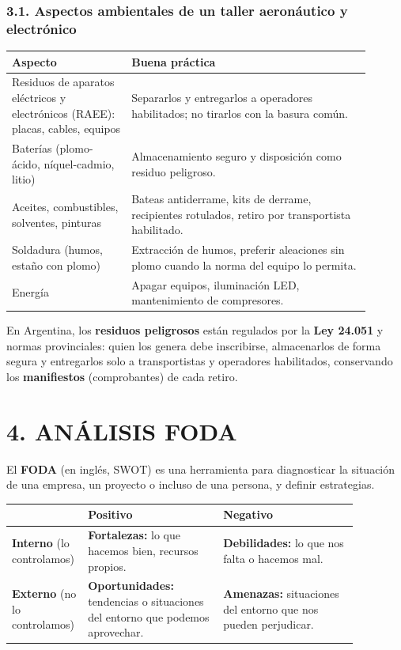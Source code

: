 \subsubsection*{3.1. Aspectos ambientales de un taller aeronáutico y electrónico}
\begin{center}
\small
\begin{tabular}{|p{0.30\linewidth}|p{0.60\linewidth}|}
\hline
\textbf{Aspecto} & \textbf{Buena práctica} \\ \hline
Residuos de aparatos eléctricos y electrónicos (RAEE): placas, cables, equipos & Separarlos y
entregarlos a operadores habilitados; no tirarlos con la basura común. \\ \hline
Baterías (plomo-ácido, níquel-cadmio, litio) & Almacenamiento seguro y disposición como
residuo peligroso. \\ \hline
Aceites, combustibles, solventes, pinturas & Bateas antiderrame, kits de derrame,
recipientes rotulados, retiro por transportista habilitado. \\ \hline
Soldadura (humos, estaño con plomo) & Extracción de humos, preferir aleaciones sin plomo cuando
la norma del equipo lo permita. \\ \hline
Energía & Apagar equipos, iluminación LED, mantenimiento de compresores. \\ \hline
\end{tabular}
\end{center}

En Argentina, los \textbf{residuos peligrosos} están regulados por la \textbf{Ley 24.051} y
normas provinciales: quien los genera debe inscribirse, almacenarlos de forma segura y
entregarlos solo a transportistas y operadores habilitados, conservando los
\textbf{manifiestos} (comprobantes) de cada retiro.

\section*{4. ANÁLISIS FODA}

El \textbf{FODA} (en inglés, SWOT) es una herramienta para diagnosticar la situación de una
empresa, un proyecto o incluso de una persona, y definir estrategias.

\begin{center}
\small
\begin{tabular}{|p{0.13\linewidth}|p{0.37\linewidth}|p{0.37\linewidth}|}
\hline
 & \textbf{Positivo} & \textbf{Negativo} \\ \hline
\textbf{Interno} (lo controlamos) & \textbf{Fortalezas:} lo que hacemos bien, recursos
propios. & \textbf{Debilidades:} lo que nos falta o hacemos mal. \\ \hline
\textbf{Externo} (no lo controlamos) & \textbf{Oportunidades:} tendencias o situaciones del
entorno que podemos aprovechar. & \textbf{Amenazas:} situaciones del entorno que nos pueden
perjudicar. \\ \hline
\end{tabular}
\end{center}

